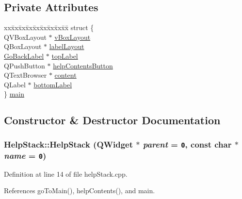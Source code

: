 \subsection*{Private Attributes}
\begin{CompactItemize}
\item 
\begin{tabbing}
xx\=xx\=xx\=xx\=xx\=xx\=xx\=xx\=xx\=\kill
struct \{\\
\>QVBoxLayout $\ast$ \hyperlink{classHelpStack_r0}{vBoxLayout}\\
\>QBoxLayout $\ast$ \hyperlink{classHelpStack_r1}{labelLayout}\\
\>\hyperlink{classGoBackLabel}{GoBackLabel} $\ast$ \hyperlink{classHelpStack_r2}{topLabel}\\
\>QPushButton $\ast$ \hyperlink{classHelpStack_r3}{helpContentsButton}\\
\>QTextBrowser $\ast$ \hyperlink{classHelpStack_r4}{content}\\
\>QLabel $\ast$ \hyperlink{classHelpStack_r5}{bottomLabel}\\
\} \hyperlink{classHelpStack_r6}{main}\\

\end{tabbing}\end{CompactItemize}


\subsection{Constructor \& Destructor Documentation}
\hypertarget{classHelpStack_a0}{
\subsubsection[HelpStack]{\setlength{\rightskip}{0pt plus 5cm}Help\-Stack::Help\-Stack (QWidget $\ast$ {\em parent} = {\tt 0}, const char $\ast$ {\em name} = {\tt 0})}}
\label{classHelpStack_a0}


Definition at line 14 of file help\-Stack.cpp.

References go\-To\-Main(), help\-Contents(), and main.

